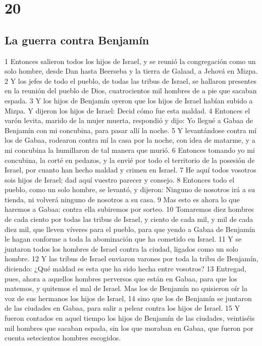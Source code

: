 \chapter{20}

\section*{La guerra contra Benjamín}

1 Entonces salieron todos los hijos de Israel, y se reunió la congregación como un solo hombre, desde Dan hasta Beerseba y la tierra de Galaad, a Jehová en Mizpa.
2 Y los jefes de todo el pueblo, de todas las tribus de Israel, se hallaron presentes en la reunión del pueblo de Dios, cuatrocientos mil hombres de a pie que sacaban espada.
3 Y los hijos de Benjamín oyeron que los hijos de Israel habían subido a Mizpa. Y dijeron los hijos de Israel: Decid cómo fue esta maldad.
4 Entonces el varón levita, marido de la mujer muerta, respondió y dijo: Yo llegué a Gabaa de Benjamín con mi concubina, para pasar allí la noche.
5 Y levantándose contra mí los de Gabaa, rodearon contra mí la casa por la noche, con idea de matarme, y a mi concubina la humillaron de tal manera que murió.
6 Entonces tomando yo mi concubina, la corté en pedazos, y la envié por todo el territorio de la posesión de Israel, por cuanto han hecho maldad y crimen en Israel.
7 He aquí todos vosotros sois hijos de Israel; dad aquí vuestro parecer y consejo.
8 Entonces todo el pueblo, como un solo hombre, se levantó, y dijeron: Ninguno de nosotros irá a su tienda, ni volverá ninguno de nosotros a su casa.
9 Mas esto es ahora lo que haremos a Gabaa: contra ella subiremos por sorteo.
10 Tomaremos diez hombres de cada ciento por todas las tribus de Israel, y ciento de cada mil, y mil de cada diez mil, que lleven víveres para el pueblo, para que yendo a Gabaa de Benjamín le hagan conforme a toda la abominación que ha cometido en Israel.
11 Y se juntaron todos los hombres de Israel contra la ciudad, ligados como un solo hombre.
12 Y las tribus de Israel enviaron varones por toda la tribu de Benjamín, diciendo: ¿Qué maldad es esta que ha sido hecha entre vosotros?
13 Entregad, pues, ahora a aquellos hombres perversos que están en Gabaa, para que los matemos, y quitemos el mal de Israel. Mas los de Benjamín no quisieron oír la voz de sus hermanos los hijos de Israel,
14 sino que los de Benjamín se juntaron de las ciudades en Gabaa, para salir a pelear contra los hijos de Israel.
15 Y fueron contados en aquel tiempo los hijos de Benjamín de las ciudades, veintiséis mil hombres que sacaban espada, sin los que moraban en Gabaa, que fueron por cuenta setecientos hombres escogidos.
